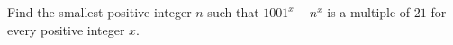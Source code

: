 Find the smallest positive integer $n$ such that $1001^x-n^x$ is a multiple of $21$ for every positive integer $x$.
